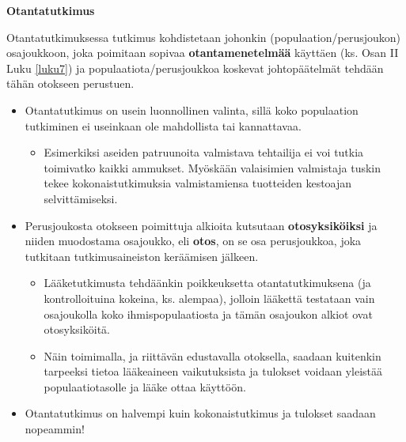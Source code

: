 \documentclass[
]{book}
\providecommand{\tightlist}{%
  \setlength{\itemsep}{0pt}\setlength{\parskip}{0pt}}
\begin{document}
\begin{defblock}{}

\textbf{Otantatutkimus}

Otantatutkimuksessa tutkimus kohdistetaan johonkin (populaation/perusjoukon) osajoukkoon, joka poimitaan sopivaa \textbf{otantamenetelmää} käyttäen (ks. Osan II Luku \ref{luku7}) ja populaatiota/perusjoukkoa koskevat johtopäätelmät tehdään tähän otokseen perustuen.

\begin{itemize}
\tightlist
\item
  Otantatutkimus on usein luonnollinen valinta, sillä koko populaation tutkiminen ei useinkaan ole mahdollista tai kannattavaa.

  \begin{itemize}
  \tightlist
  \item
    Esimerkiksi aseiden patruunoita valmistava tehtailija ei voi tutkia toimivatko kaikki ammukset. Myöskään valaisimien valmistaja tuskin tekee kokonaistutkimuksia valmistamiensa tuotteiden kestoajan selvittämiseksi.\\
  \end{itemize}
\item
  Perusjoukosta otokseen poimittuja alkioita kutsutaan \textbf{otosyksiköiksi} ja niiden muodostama osajoukko, eli \textbf{otos}, on se osa perusjoukkoa, joka tutkitaan tutkimusaineiston keräämisen jälkeen.

  \begin{itemize}
  \tightlist
  \item
    Lääketutkimusta tehdäänkin poikkeuksetta otantatutkimuksena (ja kontrolloituina kokeina, ks. alempaa), jolloin lääkettä testataan vain osajoukolla koko ihmispopulaatiosta ja tämän osajoukon alkiot ovat otosyksiköitä.
  \item
    Näin toimimalla, ja riittävän edustavalla otoksella, saadaan kuitenkin tarpeeksi tietoa lääkeaineen vaikutuksista ja tulokset voidaan yleistää populaatiotasolle ja lääke ottaa käyttöön.
  \end{itemize}
\item
  Otantatutkimus on halvempi kuin kokonaistutkimus ja tulokset saadaan nopeammin!
\end{itemize}

\end{defblock}
\end{document}
